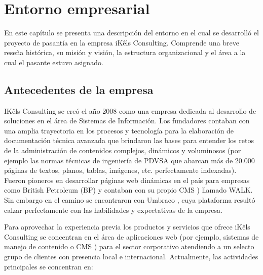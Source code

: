 \chapter{Entorno empresarial} \label{empresa}
En este capítulo se presenta una descripción del entorno en el cual se desarrolló el proyecto de pasantía en la empresa iKêls Consulting. Comprende una breve reseña histórica, su misión y visión, la estructura organizacional y el área a la cual el pasante estuvo asignado.

\section{Antecedentes de la empresa}
IKêls Consulting \cite{ikels} se creó el año 2008 como una empresa dedicada al desarrollo de soluciones en el área de Sistemas de Información. Los fundadores contaban con una amplia trayectoria en los procesos y tecnología para la elaboración de documentación técnica avanzada que brindaron las bases para entender los retos de la administración de contenidos complejos, dinámicos y voluminosos (por ejemplo las normas técnicas de ingeniería de PDVSA que abarcan más de 20.000 páginas de textos, planos, tablas, imágenes, etc. perfectamente indexadas).
Fueron pioneros en desarrollar páginas web dinámicas en el país para empresas como British Petroleum (BP) y contaban con su propio CMS \cite{cmsBarker}) llamado WALK. Sin embargo en el camino se encontraron con Umbraco \cite{umbraco}, cuya plataforma resultó calzar perfectamente con las habilidades y expectativas de la empresa. 

Para aprovechar la experiencia previa los productos y servicios que ofrece iKêls Consulting \cite{ikels} se concentran en el área de aplicaciones web (por ejemplo, sistemas de manejo de contenido o CMS \cite{cmsBarker}) para el sector corporativo atendiendo a un selecto grupo de clientes con presencia local e internacional.
Actualmente, las actividades principales se concentran en:

